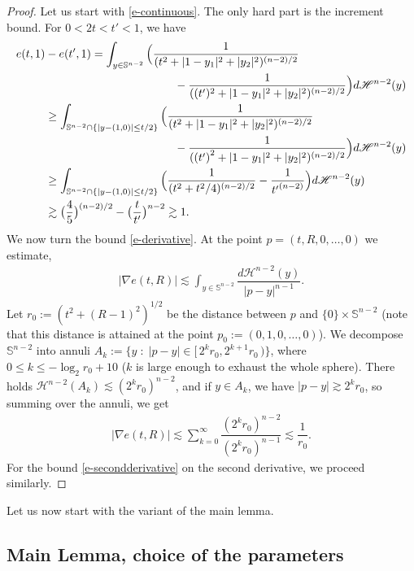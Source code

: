 \documentclass[10pt]{amsart}
\numberwithin{equation}{section}
\theoremstyle{plain}
\theoremstyle{definition}
\begin{document}
\begin{proof}
Let us start with \eqref{e-continuous}. The only hard part is the increment bound. For $0<2t<t'<1$, we have
\begin{align*}
e(t, 1) &-e(t',1) = \int_{y\in \mathbb{S}^{n-2}} \Big (\dfrac{1}{(t^2+ |1-y_1|^2 +|y_2|^2)^{(n-2)/2}} \\
&\hspace*{4cm}- \dfrac{1}{((t')^2+ |1-y_1|^2 +|y_2|^2)^{(n-2)/2}} \Big )d \mathscr{H}^{n-2}(y)\\
&\ge \int_{\mathbb{S}^{n-2}\cap \{|y-(1,0)| \le t/2\}} \Big (\dfrac{1}{(t^2+ |1-y_1|^2 +|y_2|^2)^{(n-2)/2}} \\
&\hspace*{4cm}- \dfrac{1}{({(t')}^2+ |1-y_1|^2 +|y_2|^2)^{(n-2)/2}} \Big )d \mathscr{H}^{n-2}(y)\\
&\ge \int_{\mathbb{S}^{n-2} \cap \{|y-(1,0)| \le t/2\}} \Big (\dfrac{1}{(t^2 + t^2/4 )^{(n-2)/2}} - \dfrac{1}{ {t'}^{(n-2)}} \Big ) d \mathscr{H}^{n-2}(y)\\
&\gtrsim \big( \dfrac{4}{5}\big )^{(n-2)/2} - \big (\dfrac{t}{t'}\big )^{n-2} \gtrsim 1 .
\end{align*}
We now turn the bound \eqref{e-derivative}. At the point $p=(t,R,0,\dots,0)$ we estimate,
\begin{align*}
|\nabla e(t,R)| \lesssim \int_{y\in \mathbb{S}^{n-2}} \dfrac{ d \mathscr{H}^{n-2}(y)}{ |p-y|^{n-1}}.
\end{align*}
Let $r_0:= (t^2 +(R-1)^2)^{1/2}$ be the distance between $p$ and $\{0\} \times \mathbb{S}^{n-2}$ (note that this distance is attained at the point $p_0:=(0,1,0,\dots, 0)$). We decompose $\mathbb{S}^{n-2}$ into annuli $A_k:= \{ y \; : \; |p-y|\in [\,2^k r_0, 2^{k+1} r_0\,)\}$, where $0 \le k \le -\log_2 r_0 + 10$ (\ie $k$ is large enough to exhaust the whole sphere). There holds $\mathscr{H}^{n-2}(A_k) \lesssim (2^k r_0)^{n-2}$, and if $y\in A_k$, we have $|p-y | \gtrsim 2^kr_0$, so summing over the annuli, we get
\begin{align*}
|\nabla e(t,R)| \lesssim \sum_{k=0}^{\infty} \dfrac{(2^kr_0)^{n-2}}{(2^kr_0) ^{n-1}} \lesssim \dfrac{1}{r_0}.
\end{align*}
For the bound \eqref{e-secondderivative} on the second derivative, we proceed similarly.
\end{proof}
Let us now start with the variant of the main lemma.

\subsection{Main Lemma, choice of the parameters}
\end{document}
